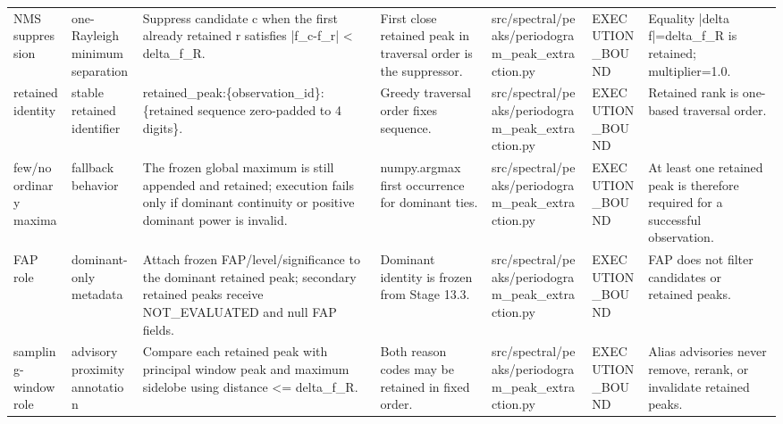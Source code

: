 \begin{longtable}{lllllll}
NMS suppression & one-Rayleigh minimum separation & Suppress candidate c when the first already retained r satisfies |f\_c-f\_r| < delta\_f\_R. & First close retained peak in traversal order is the suppressor. & src/spectral/peaks/periodogram\_peak\_extraction.py & EXECUTION\_BOUND & Equality |delta f|=delta\_f\_R is retained; multiplier=1.0. \\
retained identity & stable retained identifier & retained\_peak:\{observation\_id\}:\{retained sequence zero-padded to 4 digits\}. & Greedy traversal order fixes sequence. & src/spectral/peaks/periodogram\_peak\_extraction.py & EXECUTION\_BOUND & Retained rank is one-based traversal order. \\
few/no ordinary maxima & fallback behavior & The frozen global maximum is still appended and retained; execution fails only if dominant continuity or positive dominant power is invalid. & numpy.argmax first occurrence for dominant ties. & src/spectral/peaks/periodogram\_peak\_extraction.py & EXECUTION\_BOUND & At least one retained peak is therefore required for a successful observation. \\
FAP role & dominant-only metadata & Attach frozen FAP/level/significance to the dominant retained peak; secondary retained peaks receive NOT\_EVALUATED and null FAP fields. & Dominant identity is frozen from Stage 13.3. & src/spectral/peaks/periodogram\_peak\_extraction.py & EXECUTION\_BOUND & FAP does not filter candidates or retained peaks. \\
sampling-window role & advisory proximity annotation & Compare each retained peak with principal window peak and maximum sidelobe using distance <= delta\_f\_R. & Both reason codes may be retained in fixed order. & src/spectral/peaks/periodogram\_peak\_extraction.py & EXECUTION\_BOUND & Alias advisories never remove, rerank, or invalidate retained peaks. \\
\bottomrule
\end{longtable}
